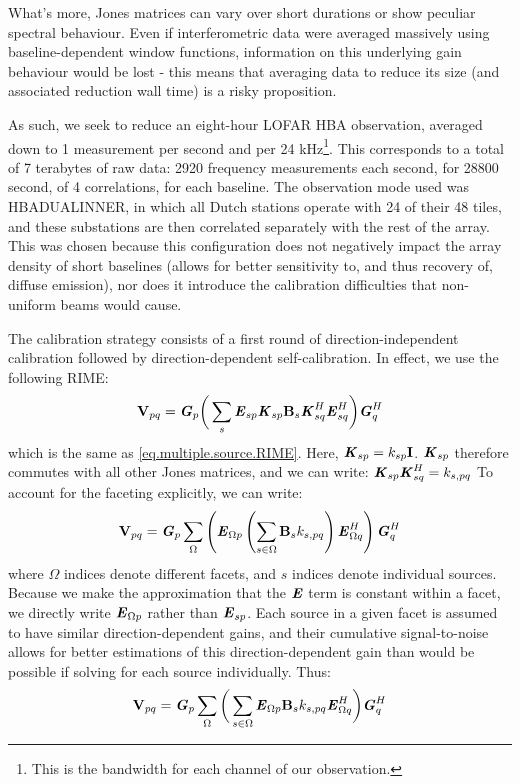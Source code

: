\pg
What's more, Jones matrices can vary over short durations or show peculiar spectral behaviour. Even if interferometric data were averaged massively using baseline-dependent window functions, information on this underlying gain behaviour would be lost - this means that averaging data to reduce its size (and associated reduction wall time) is a risky proposition.

\pg
As such, we seek to reduce an eight-hour LOFAR HBA observation, averaged down to 1 measurement per second and per 24 kHz\footnote{This is the bandwidth for each channel of our observation.}. This corresponds to a total of 7 terabytes of raw data: 2920 frequency measurements each second, for 28800 second, of 4 correlations, for each baseline. The observation mode used was HBA\textunderscore DUAL\textunderscore INNER, in which all Dutch stations operate with 24 of their 48 tiles, and these substations are then correlated separately with the rest of the array. This was chosen because this configuration does not negatively impact the array density of short baselines (allows for better sensitivity to, and thus recovery of, diffuse emission), nor does it introduce the calibration difficulties that non-uniform beams would cause.

\pg
The calibration strategy consists of a first round of direction-independent calibration followed by direction-dependent self-calibration. In effect, we use the following RIME:
\begin{equation}
\textbf{V}_{pq} = \textbf{\emph{G}}_p \bigg( \sum_s \textbf{\emph{E}}_{sp} \textbf{\emph{K}}_{sp} \textbf{B}_{s} \textbf{\emph{K}}_{sq}^H \textbf{\emph{E}}_{sq}^H \bigg) \textbf{\emph{G}}_q^H
\end{equation}
which is the same as \cref{eq.multiple.source.RIME}. Here, $\textbf{\emph{K}}_{sp}=k_{sp}\bm{\mathrm{I}}$. $\textbf{\emph{K}}_{sp}$ therefore commutes with all other Jones matrices, and we can write: $\textbf{\emph{K}}_{sp}\textbf{\emph{K}}_{sq}^H=k_{s,pq}$ To account for the faceting explicitly, we can write:
\begin{equation}
\textbf{V}_{pq} = \textbf{\emph{G}}_p \sum_{\Omega}\left( \textbf{\emph{E}}_{\Omega p} \left( \sum_{s\in\Omega}\textbf{B}_{s} k_{s,pq}\right) \textbf{\emph{E}}_{\Omega q}^H \right) \textbf{\emph{G}}_q^H
\end{equation}
where $\Omega$ indices denote different facets, and $s$ indices denote individual sources. Because we make the approximation that the $\textbf{\emph{E}}$ term is constant within a facet, we directly write $\textbf{\emph{E}}_{\Omega p}$ rather than $\textbf{\emph{E}}_{sp}$. Each source in a given facet is assumed to have similar direction-dependent gains, and their cumulative signal-to-noise allows for better estimations of this direction-dependent gain than would be possible if solving for each source individually. 
Thus:
\begin{equation}
\textbf{V}_{pq} = \textbf{\emph{G}}_p \sum_{\Omega}\bigg( \sum_{s\in\Omega} \textbf{\emph{E}}_{\Omega p} \textbf{B}_{s} k_{s,pq} \textbf{\emph{E}}_{\Omega q}^H \bigg) \textbf{\emph{G}}_q^H
\end{equation}

